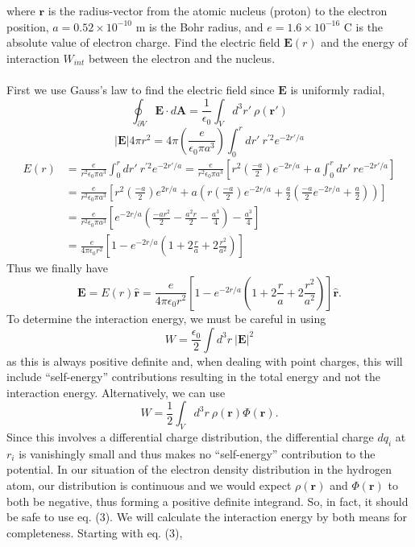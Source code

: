 \documentclass[11pt,letterpaper]{article}
\newcommand{\vect}[1]{\mathbf{#1}}
\begin{document}
\begin{enumerate}
where $\vect r$ is the radius-vector from the atomic nucleus (proton) to the electron position, $a = 0.52\times10^{-10}$ m is the Bohr radius, and $e=1.6\times10^{-16}$ C is the absolute value of electron charge. Find the electric field $\vect  E(r)$ and the energy of interaction $W_{int}$ between the electron and the nucleus.
\\ \\First we use Gauss's law to find the electric field since $\vect E$ is uniformly radial,
$$\oint_{\partial V}{\vect E\cdot d\vect A} = \frac{1}{\epsilon_0}\int_{V}{d^3r'\ \rho(\vect r')}$$
$$|\vect E|4\pi r^2 = 4\pi\left(\frac{e}{\epsilon_0\pi a^3}\right)\int_{0}^{r}{dr'\ r^{'2}e^{-2r'/a}}$$
\begin{align*}
E(r) &=\frac{e}{r^2\epsilon_0\pi a^3}\int_{0}^{r}{dr'\ r^{'2}e^{-2r'/a}} = \frac{e}{r^2\epsilon_0\pi a^3}\left[r^2\left(\frac{-a}{2}\right)e^{-2r/a}+a\int_{0}^{r}{dr'\ re^{-2r'/a}}\right] \\
&=\frac{e}{r^2\epsilon_0\pi a^3}\left[r^2\left(\frac{-a}{2}\right)e^{2r/a}+a\left(r\left(\frac{-a}{2}\right)e^{-2r/a}+\frac{a}{2}\left(\frac{-a}{2}e^{-2r/a}+\frac{a}{2}\right)\right)\right]\\
&=\frac{e}{r^2\epsilon_0\pi a^3}\left[e^{-2r/a}\left(\frac{-ar^2}{2}-\frac{a^2r}{2}-\frac{a^3}{4}\right)-\frac{a^3}{4}\right]\\
&=\frac{e}{4\pi\epsilon_0 r^2}\left[1-e^{-2r/a}\left(1+2\frac{r}{a}+2\frac{r^2}{a^2}\right)\right]
\end{align*}
Thus we finally have
$$\vect E= E(r) \hat{\vect r} = \frac{e}{4\pi\epsilon_0 r^2}\left[1-e^{-2r/a}\left(1+2\frac{r}{a}+2\frac{r^2}{a^2}\right)\right]\hat{\vect r}.$$
To determine the interaction energy, we must be careful in using
\begin{equation}W=\frac{\epsilon_0}{2}\int{d^3r\ |\vect E|^2}\end{equation} 
as this is always positive definite and, when dealing with point charges, this will include ``self-energy'' contributions resulting in the total energy and not the interaction energy. Alternatively, we can use
\begin{equation}W = \frac{1}{2}\int_{V}{d^3r\ \rho(\vect r)\Phi(\vect r)}.\end{equation}
Since this involves a differential charge distribution, the differential charge $dq_i$ at $r_i$ is vanishingly small and thus makes no ``self-energy'' contribution to the potential. In our situation of the electron density distribution in the hydrogen atom, our distribution is continuous and we would expect $\rho(\vect r)$ and $\Phi(\vect r)$ to both be negative, thus forming a positive definite integrand. So, in fact, it should be safe to use eq. (3). We will calculate the interaction energy by both means for completeness. Starting with eq. (3),

\end{enumerate}
\end{document}
